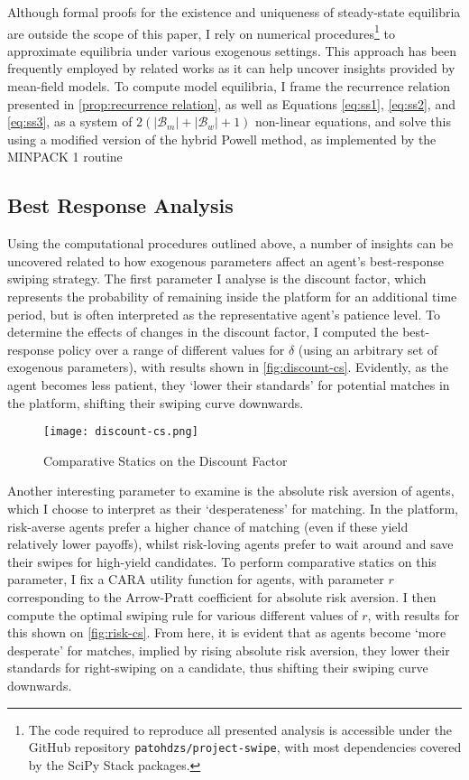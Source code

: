 Although formal proofs for the existence and uniqueness of steady-state equilibria are outside the scope of this paper, I rely on numerical procedures\footnote{The code required to reproduce all presented analysis is accessible under the GitHub repository \texttt{patohdzs/project-swipe}, with most dependencies covered by the SciPy Stack packages.} to approximate equilibria under various exogenous settings. This approach has been frequently employed by related works \citep[see][]{iyer2014mean, gummadi2011optimal} as it can help uncover insights provided by mean-field models. To compute model equilibria, I frame the recurrence relation presented in \autoref{prop:recurrence relation}, as well as Equations \ref{eq:ss1}, \ref{eq:ss2}, and \ref{eq:ss3}, as a system of $2(|\mathcal{B}_m|+|\mathcal{B}_w|+1)$ non-linear equations, and solve this using a modified version of the hybrid Powell method, as implemented by the MINPACK 1 routine \citep{more1980user}  

\subsection{Best Response Analysis}\label{sec:section3.2} 
Using the computational procedures outlined above, a number of insights can be uncovered related to how exogenous parameters affect an agent's best-response swiping strategy. The first parameter I analyse is the discount factor, which represents the probability of remaining inside the platform for an additional time period, but is often interpreted as the representative agent's patience level. To determine the effects of changes in the discount factor, I computed the best-response policy over a range of different values for $\delta$ (using an arbitrary set of exogenous parameters), with results shown in \autoref{fig:discount-cs}. Evidently, as the agent becomes less patient, they `lower their standards' for potential matches in the platform, shifting their swiping curve downwards. 

\begin{figure}[ht] 
    \centering
    \caption{Comparative Statics on the Discount Factor}
    \texttt{[image: discount-cs.png]}
    \label{fig:discount-cs}
\end{figure} 

Another interesting parameter to examine is the absolute risk aversion of agents, which I choose to interpret as their `desperateness' for matching. In the platform, risk-averse agents prefer a higher chance of matching (even if these yield relatively lower payoffs), whilst risk-loving agents prefer to wait around and save their swipes for high-yield candidates. To perform comparative statics on this parameter, I fix a CARA utility function for agents, with parameter $r$ corresponding to the Arrow-Pratt coefficient for absolute risk aversion. I then compute the optimal swiping rule for various different values of $r$, with results for this shown on \autoref{fig:risk-cs}. From here, it is evident that as agents become `more desperate' for matches, implied by rising absolute risk aversion, they lower their standards for right-swiping on a candidate, thus shifting their swiping curve downwards.

